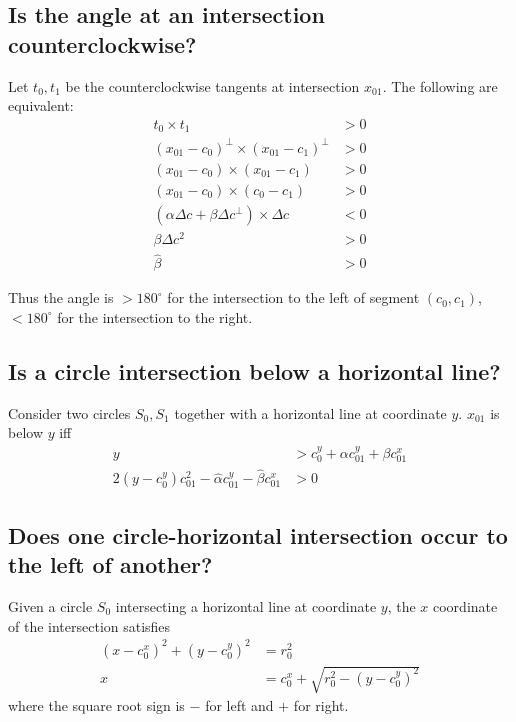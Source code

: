 \documentclass[11pt]{article}
\begin{document}
\subsection{Is the angle at an intersection counterclockwise?}

Let $t_0, t_1$ be the counterclockwise tangents at intersection $x_{01}$.  The following are equivalent:
\begin{align*}
t_0 \times t_1 &> 0 \\
(x_{01} - c_0)^\perp \times (x_{01} - c_1)^\perp &> 0 \\
(x_{01} - c_0) \times (x_{01} - c_1) &> 0 \\
(x_{01} - c_0) \times (c_0 - c_1) &> 0 \\
(\alpha \Delta c + \beta \Delta c^\perp) \times \Delta c &< 0 \\
\beta \Delta c^2 &> 0 \\
\hat{\beta} &> 0
\end{align*}

Thus the angle is $> 180^\circ$ for the intersection to the left of segment $(c_0,c_1)$, $< 180^\circ$ for the intersection to the right.

\subsection{Is a circle intersection below a horizontal line?}

Consider two circles $S_0, S_1$ together with a horizontal line at coordinate $y$.  $x_{01}$ is below $y$ iff
\begin{align*}
y &> c_0^y + \alpha c_{01}^y + \beta c_{01}^x \\
2 (y-c_0^y) c_{01}^2 - \hat{\alpha} c_{01}^y - \hat{\beta} c_{01}^x &> 0
\end{align*}

\subsection{Does one circle-horizontal intersection occur to the left of another?}

Given a circle $S_0$ intersecting a horizontal line at coordinate $y$, the $x$ coordinate of the intersection satisfies
\begin{align*}
(x-c_0^x)^2 + (y-c_0^y)^2 &= r_0^2 \\
x &= c_0^x + \sqrt{r_0^2 - (y-c_0^y)^2}
\end{align*}
where the square root sign is $-$ for left and $+$ for right.
\end{document}

